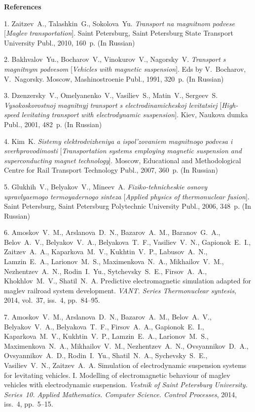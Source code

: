 
{\small

\vskip6mm

\noindent \textbf{References} }

\vskip 2mm

{\footnotesize

1. Zaitzev~A., Talashkin~G., Sokolova~Yu. {\em Transport na
magnitnom podvese} [{\em Maglev transportation}]. Saint
Petersburg, Saint Petersburg State Transport University Publ.,
2010, 160~p. (In Russian)

2. Bakhvalov~Yu., Bocharov~V., Vinokurov~V., Nagorsky~V. {\em
Transport s magnitnym podvesom} [{\em Vehicles with magnetic
suspension}]. Eds by V.~Bocharov, V.~Nagorsky. Moscow,
Mashinostroenie Publ., 1991, 320~p. (In Russian)

3. Dzenzersky~V., Omelyanenko~V., Vasiliev~S., Matin~V.,
Sergeev~S. {\em Vysokoskorostnoj magnitnyj transport s
electrodinamicheskoj levitatsiej} [{\em High-speed levitating
transport with electrodynamic suspension}]. Kiev, Naukova dumka
Publ., 2001, 482~p. (In Russian)

4. Kim~K. {\em Sistemy elektrodvizheniya a ispol'zovaniem
magnitnogo podvesa i sverhprovodimosti} [{\em Transportation
systems employing magnetic suspension and superconducting magnet
technology}]. Moscow, Educational and Methodological Centre for
Rail Transport Technology Publ., 2007, 360~p. (In Russian)

5. Glukhih~V., Belyakov~V., Mineev~A. {\em Fiziko-tehnicheskie
osnovy upravlyaemogo termoyadernogo sinteza} [{\em Applied physics
of thermonuclear fusion}]. Saint Petersburg, Saint Petersburg
Polytechnic University Publ., 2006, 348~p. (In Russian)

6. Amoskov~V.~M., Arslanova~D.~N., Bazarov~A.~M., Baranov~G.~A.,
Belov~A.~V., Belyakov~V.~A., Belyakova~T.~F., Vasiliev~V.~N.,
Gapionok~E.~I., Zaitzev~A.~A., Kaparkova~M.~V., Kukhtin~V.~P.,
Labusov~A.~N., Lamzin~E.~A., Larionov~M.~S., Maximenkova~N.~A.,
Mikhailov~V.~M., Nezhentzev~A.~N., Rodin~I.~Yu., Sytchevsky~S.~E.,
Firsov~A.~A., Khokhlov~M.~V., Shatil~N.~A. Predictive
electromagnetic simulation adapted for maglev railroad system
development. {\em VANT. Series Thermonuclear syntesis}, 2014,
vol.~37, iss.~4, pp.~84--95.

7. Amoskov~V.~M., Arslanova~D.~N., Bazarov~A.~M., Belov~A.~V.,
Belyakov~V.~A., Belyakova~T.~F., Firsov~A.~A., Gapionok~E.~I.,
Kaparkova~M.~V., Kukhtin~V.~P., Lamzin~E.~A., Larionov~M.~S.,
Maximenkova~N.~A., Mikhailov~V.~M., Nezhentzev~A.~N.,
Ovsyannikov~D.~A., Ovsyannikov~A.~D., Rodin~I.~Yu., Shatil~N.~A.,
Sychevsky~S.~E., Vasiliev~V.~N., Zaitzev~A.~A. Simulation of
electrodynamic suspension systems for levitating vehicles. I.
Modelling of electromagnetic behaviour of maglev vehicles with
electrodynamic suspension. {\em Vestnik of Saint Petersburg
University. Series~10. Applied Mathematics. Computer Science.
Control Processes}, 2014, iss.~4, pp.~5--15.

}
